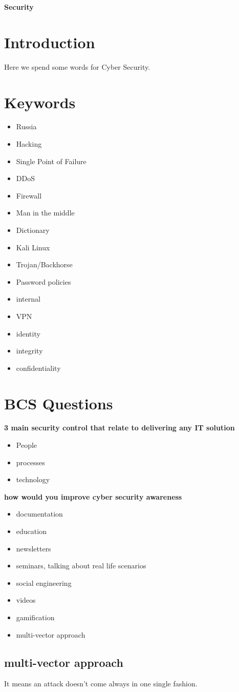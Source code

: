 \documentclass[a4paper,12pt]{article}
\begin{document}
\textbf{Security}


\tableofcontents
\clearpage

 
\section{Introduction}
Here we spend some words for Cyber Security.
\section{Keywords}

\begin{itemize}
\item Russia
\item Hacking
\item Single Point of Failure
\item DDoS
\item Firewall
\item Man in the middle
\item Dictionary
\item Kali Linux
\item Trojan/Backhorse
\item Password policies
\item internal
\item VPN
\item identity 
\item integrity
\item confidentiality
\end{itemize}

\section{BCS Questions}

\textbf {3 main security control that relate to delivering any IT solution}
\begin{itemize}
\item People
\item processes
\item technology 
\end{itemize}


\textbf {how would you improve cyber security awareness}
\begin{itemize}
\item documentation
\item education
\item newsletters
\item seminars, talking about real life scenarios
\item social engineering
\item videos
\item gamification
\item multi-vector approach
\end{itemize}

\subsection{multi-vector approach}
It means an attack doesn't come always in one single fashion. 


\clearpage

\printindex
\end{document}
